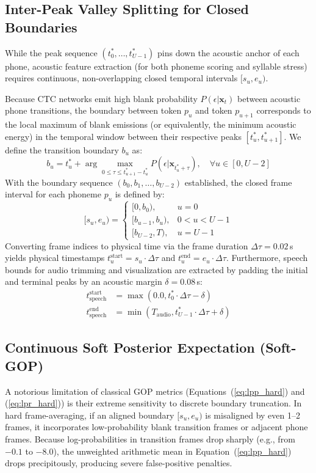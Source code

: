 \documentclass[10pt,conference]{IEEEtran}
\begin{document}
\subsection{Inter-Peak Valley Splitting for Closed Boundaries}
\label{sec:valley_splitting}
While the peak sequence $(t_0^*, \dots, t_{U-1}^*)$ pins down the acoustic anchor of each phone, acoustic feature extraction (for both phoneme scoring and syllable stress) requires continuous, non-overlapping closed temporal intervals $[s_u, e_u)$.

Because CTC networks emit high blank probability $P(\epsilon | \mathbf{x}_t)$ between acoustic phone transitions, the boundary between token $p_u$ and token $p_{u+1}$ corresponds to the local maximum of blank emissions (or equivalently, the minimum acoustic energy) in the temporal window between their respective peaks $[t_u^*, t_{u+1}^*]$. We define the transition boundary $b_u$ as:
\begin{equation}
b_u = t_u^* + \arg\max_{0 \le \tau \le t_{u+1}^* - t_u^*} P(\epsilon | \mathbf{x}_{t_u^* + \tau}), \quad \forall u \in [0, U-2]
\label{eq:valley_split}
\end{equation}
With the boundary sequence $(b_0, b_1, \dots, b_{U-2})$ established, the closed frame interval for each phoneme $p_u$ is defined by:
\begin{equation}
[s_u, e_u) = 
\begin{cases}
[0, b_0), & u = 0 \\
[b_{u-1}, b_u), & 0 < u < U-1 \\
[b_{U-2}, T), & u = U-1
\end{cases}
\label{eq:closed_interval}
\end{equation}
Converting frame indices to physical time via the frame duration $\Delta \tau = 0.02$\,s yields physical timestamps $t_u^{\text{start}} = s_u \cdot \Delta \tau$ and $t_u^{\text{end}} = e_u \cdot \Delta \tau$. Furthermore, speech bounds for audio trimming and visualization are extracted by padding the initial and terminal peaks by an acoustic margin $\delta = 0.08$\,s:
\begin{align}
t_{\text{speech}}^{\text{start}} &= \max(0.0, t_0^* \cdot \Delta \tau - \delta) \\
t_{\text{speech}}^{\text{end}} &= \min(T_{\text{audio}}, t_{U-1}^* \cdot \Delta \tau + \delta)
\end{align}

\subsection{Continuous Soft Posterior Expectation (Soft-GOP)}
\label{sec:soft_gop}
A notorious limitation of classical GOP metrics (Equations~(\ref{eq:lpp_hard}) and (\ref{eq:lpr_hard})) is their extreme sensitivity to discrete boundary truncation. In hard frame-averaging, if an aligned boundary $[s_u, e_u)$ is misaligned by even 1--2 frames, it incorporates low-probability blank transition frames or adjacent phone frames. Because log-probabilities in transition frames drop sharply (e.g., from $-0.1$ to $-8.0$), the unweighted arithmetic mean in Equation~(\ref{eq:lpp_hard}) drops precipitously, producing severe false-positive penalties.
\end{document}
